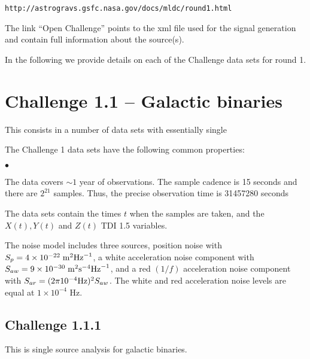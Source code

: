 \documentclass[11pt]{report}
\begin{document}
{\tt http://astrogravs.gsfc.nasa.gov/docs/mldc/round1.html}

The link ``Open Challenge'' points to the xml file used for the signal generation and contain full information about the source(s).

In the following we provide details on each of the Challenge data sets for round 1.


\section{Challenge 1.1 -- Galactic binaries}

This consists in a number of data sets with essentially single 

\bigskip

The Challenge 1 data sets have the following common properties:

\begin{list}{$\bullet$}{}
  \item{The data covers $\sim 1$ year of observations. The sample cadence is
15 seconds and there are $2^{21}$ samples. Thus, the precise observation time is
31457280 seconds}
  \item{The data sets contain the times $t$ when the samples are taken, and the $X(t), Y(t)$ and
$Z(t)$ TDI 1.5 variables.}
  \item{The noise model includes three sources, position noise with $S_p = 4 \times 10^{-22}\;
{\rm m}^2 {\rm Hz}^{-1}$, a white acceleration noise component with $S_{aw} = 9 \times 10^{-30}\;
{\rm m}^2 {\rm s}^{-4} {\rm Hz}^{-1}$, and a red $(1/f)$ acceleration noise component with
$S_{ar} = (2 \pi 10^{-4} {\rm Hz})^2 S_{aw}$. The white and red acceleration noise levels
are equal at $1 \times 10^{-4}$ Hz.}
\end{list}



\subsection{Challenge 1.1.1}

This is single source analysis for galactic binaries. 
\end{document}
